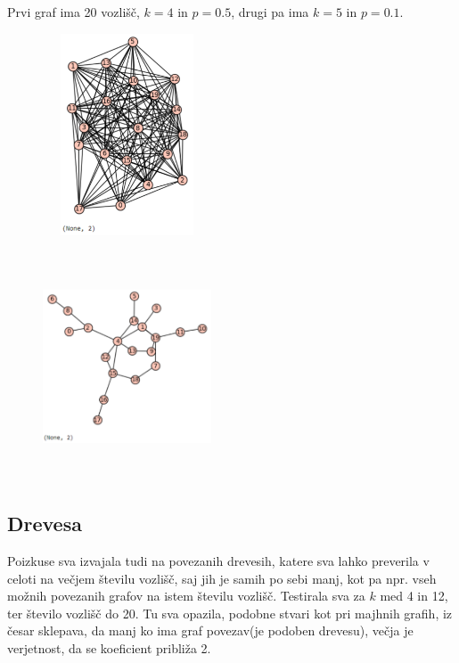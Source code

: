 \documentclass[a4paper]{article}
\begin{document}
Prvi graf ima 20 vozlišč, $k=4$ in $p=0.5$, drugi pa ima $k=5$ in $p=0.1$.
\begin{figure}[h!]
    \centering
    \includegraphics[width=5cm, height=6cm]{Slika5}
    \label{fig:mesh1}
\end{figure}\\
\begin{figure}[h!]
    \centering
    \includegraphics[width=5cm, height=5cm]{Slika6}
    \label{fig:mesh1}
\end{figure}\\
\pagebreak

\subsection{Drevesa}

Poizkuse sva izvajala tudi na povezanih drevesih, katere sva lahko preverila v celoti na večjem številu vozlišč, saj jih je samih po sebi manj, kot pa npr. vseh možnih povezanih grafov na istem številu vozlišč. Testirala sva za $k$ med 4 in 12, ter število vozlišč do 20. Tu sva opazila, podobne stvari kot pri majhnih grafih, iz česar sklepava, da manj ko ima graf povezav(je podoben drevesu), večja je verjetnost, da se koeficient približa 2.\\
\end{document}
